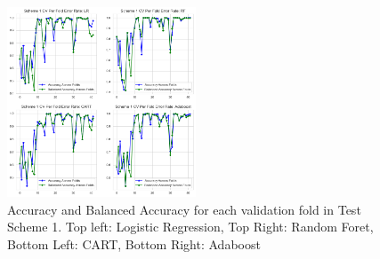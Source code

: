 \documentclass[11pt, letterpaper, journal]{IEEEtran}
\begin{document}
\begin{table}
\begin{center}
\caption{CV results and test set results for the 4 models under test scheme 1}
\label{tab:scheme1_results}
\end{center}
\end{table}

\begin{table}
\begin{center}
\caption{CV results and test set results for the 4 models under test scheme 2}
\label{tab:scheme2_results}
\end{center}
\end{table}

\begin{figure}[h]
\centering
\includegraphics[width=0.5\textwidth]{statics/test_Scheme_1_Fold_error.png}
\caption{Accuracy and Balanced Accuracy for each validation fold in Test Scheme 1. Top left: Logistic Regression, Top Right: Random Foret, Bottom Left: CART, Bottom Right: Adaboost}
\label{fig:fold_results_1}
\end{figure}
\end{document}
